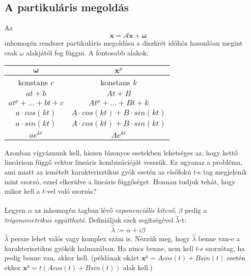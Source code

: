 \documentclass[14p]{article}
\begin{document}
\subsection{A partikuláris megoldás}
Az
\[
	\dot{\pmb{x}} = \mathcal{A}\pmb{x} + \pmb{\omega}
\]
inhomogén rendszer partikuláris megoldása a diszkrét időhöz hasonlóan megint csak $\omega$ alakjától fog függni. A fontosabb alakok:

\begin{center}
\begin{tabular}{ c c }

	$\pmb{\omega}$ & $\pmb{x}^p$ \\
	\hline
	konstans $c$ & konstans $k$ \\ 
	$at + b$ & $At + B$ \\  
	$at^p + \dots + bt + c$ & $At^p + \dots + Bt + k$ \\
	$a\cdot cos(kt)$ & $A\cdot cos(kt) + B\cdot sin(kt)$ \\    
	$a\cdot sin(kt)$ & $A\cdot cos(kt) + B\cdot sin(kt)$ \\ 
	$a e^{kt}$ & $A e^{kt}$

\end{tabular}
\end{center}
Azonban vigyáznunk kell, hiszen bizonyos esetekben lehetséges az, hogy kettő lineárisan függő vektor lineáris kombinációját vesszük. Ez ugyanaz a probléma, ami miatt az ismételt karakterisztikus gyök esetén az elsőfokú $t$-s tag megjelenik mint szorzó, ezzel elkerülve a lineáris függőséget. Honnan tudjuk tehát, hogy mikor kell a $t$-vel való szorzás?
\\
\\
Legyen $\alpha$ az inhomogén tagban lévő \emph{exponenciális kitevő}, $\beta$ pedig a \emph{trigonometrikus együttható}. Definiáljuk ezek segítségével $\hat{\lambda}$-t:
\[
	\hat{\lambda} := \alpha + i\beta
\]
$\hat{\lambda}$ persze lehet valós vagy komplex szám is. Nézzük meg, hogy $\hat{\lambda}$ benne van-e a karakterisztikus gyökök halmazában. Ha nincs benne, nem kell $t$-s szorzótag, ha pedig benne van, akkor kell. (példának okárt $\pmb{x}^p = Acos(t) + Bsin(t)$ esetén ekkor $\pmb{x}^p = t(Acos(t) + Bsin(t))$ alak kell.)
\end{document}
